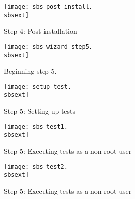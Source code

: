 \begin{figure}[htbp]
  \begin{center}
    \texttt{[image: sbs-post-install.\\sbsext]}
    \caption{Step 4: Post installation}
    \label{fig:sbs-post-install}
  \end{center}
\end{figure}

\begin{figure}[htbp]
  \begin{center}
    \texttt{[image: sbs-wizard-step5.\\sbsext]}
    \caption{Beginning step 5.}
    \label{fig:sbs-install-wizard-s5}
  \end{center}
\end{figure}

\begin{figure}[htbp]
  \begin{center}
    \texttt{[image: setup-test.\\sbsext]}
    \caption{Step 5: Setting up tests}
    \label{fig:sbs-setup-test}
  \end{center}
\end{figure}

\begin{figure}[htbp]
  \begin{center}
    \texttt{[image: sbs-test1.\\sbsext]}
    \caption{Step 5: Executing tests as a non-root user}
    \label{fig:sbs-test1}
  \end{center}
\end{figure}

\begin{figure}[htbp]
  \begin{center}
    \texttt{[image: sbs-test2.\\sbsext]}
    \caption{Step 5: Executing tests as a non-root user}
    \label{fig:sbs-test2}
  \end{center}
\end{figure}


\clearpage

